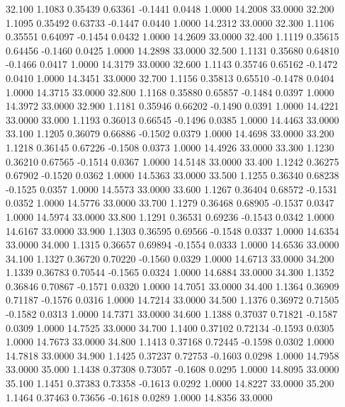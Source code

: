   32.100   1.1083   0.35439   0.63361  -0.1441   0.0448   1.0000  14.2008  33.0000
  32.200   1.1095   0.35492   0.63733  -0.1447   0.0440   1.0000  14.2312  33.0000
  32.300   1.1106   0.35551   0.64097  -0.1454   0.0432   1.0000  14.2609  33.0000
  32.400   1.1119   0.35615   0.64456  -0.1460   0.0425   1.0000  14.2898  33.0000
  32.500   1.1131   0.35680   0.64810  -0.1466   0.0417   1.0000  14.3179  33.0000
  32.600   1.1143   0.35746   0.65162  -0.1472   0.0410   1.0000  14.3451  33.0000
  32.700   1.1156   0.35813   0.65510  -0.1478   0.0404   1.0000  14.3715  33.0000
  32.800   1.1168   0.35880   0.65857  -0.1484   0.0397   1.0000  14.3972  33.0000
  32.900   1.1181   0.35946   0.66202  -0.1490   0.0391   1.0000  14.4221  33.0000
  33.000   1.1193   0.36013   0.66545  -0.1496   0.0385   1.0000  14.4463  33.0000
  33.100   1.1205   0.36079   0.66886  -0.1502   0.0379   1.0000  14.4698  33.0000
  33.200   1.1218   0.36145   0.67226  -0.1508   0.0373   1.0000  14.4926  33.0000
  33.300   1.1230   0.36210   0.67565  -0.1514   0.0367   1.0000  14.5148  33.0000
  33.400   1.1242   0.36275   0.67902  -0.1520   0.0362   1.0000  14.5363  33.0000
  33.500   1.1255   0.36340   0.68238  -0.1525   0.0357   1.0000  14.5573  33.0000
  33.600   1.1267   0.36404   0.68572  -0.1531   0.0352   1.0000  14.5776  33.0000
  33.700   1.1279   0.36468   0.68905  -0.1537   0.0347   1.0000  14.5974  33.0000
  33.800   1.1291   0.36531   0.69236  -0.1543   0.0342   1.0000  14.6167  33.0000
  33.900   1.1303   0.36595   0.69566  -0.1548   0.0337   1.0000  14.6354  33.0000
  34.000   1.1315   0.36657   0.69894  -0.1554   0.0333   1.0000  14.6536  33.0000
  34.100   1.1327   0.36720   0.70220  -0.1560   0.0329   1.0000  14.6713  33.0000
  34.200   1.1339   0.36783   0.70544  -0.1565   0.0324   1.0000  14.6884  33.0000
  34.300   1.1352   0.36846   0.70867  -0.1571   0.0320   1.0000  14.7051  33.0000
  34.400   1.1364   0.36909   0.71187  -0.1576   0.0316   1.0000  14.7214  33.0000
  34.500   1.1376   0.36972   0.71505  -0.1582   0.0313   1.0000  14.7371  33.0000
  34.600   1.1388   0.37037   0.71821  -0.1587   0.0309   1.0000  14.7525  33.0000
  34.700   1.1400   0.37102   0.72134  -0.1593   0.0305   1.0000  14.7673  33.0000
  34.800   1.1413   0.37168   0.72445  -0.1598   0.0302   1.0000  14.7818  33.0000
  34.900   1.1425   0.37237   0.72753  -0.1603   0.0298   1.0000  14.7958  33.0000
  35.000   1.1438   0.37308   0.73057  -0.1608   0.0295   1.0000  14.8095  33.0000
  35.100   1.1451   0.37383   0.73358  -0.1613   0.0292   1.0000  14.8227  33.0000
  35.200   1.1464   0.37463   0.73656  -0.1618   0.0289   1.0000  14.8356  33.0000
